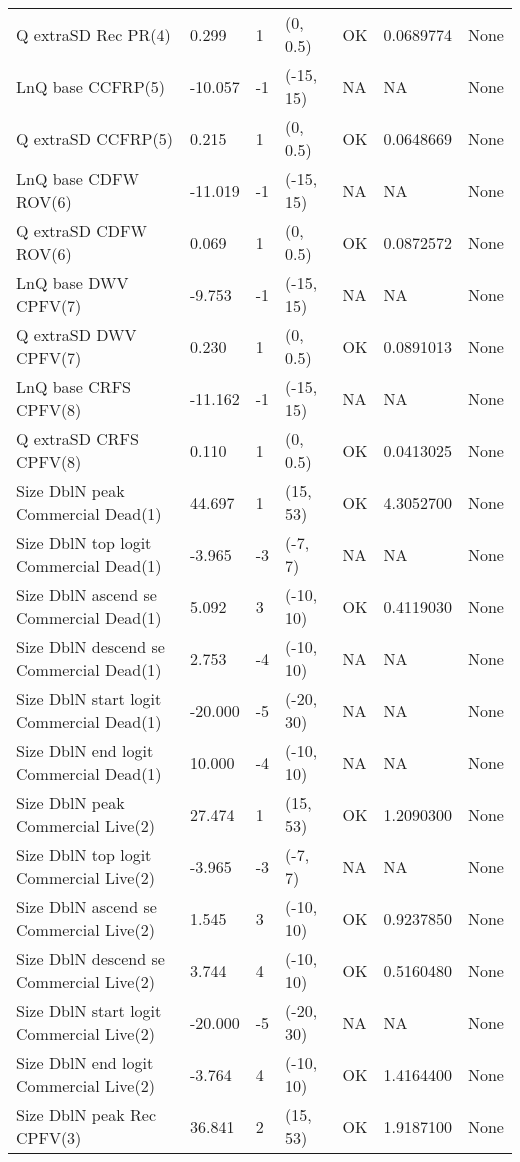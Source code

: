 \documentclass[11pt,
  english,
  letterpaper,
]{article}
\begin{document}
\begin{landscape}
\begin{longtable}[t]{>{\raggedright\arraybackslash}p{7cm}lllll>{\raggedright\arraybackslash}p{4cm}}
Q extraSD Rec PR(4) & 0.299 & 1 & (0, 0.5) & OK & 0.0689774 & None\\
LnQ base CCFRP(5) & -10.057 & -1 & (-15, 15) & NA & NA & None\\
Q extraSD CCFRP(5) & 0.215 & 1 & (0, 0.5) & OK & 0.0648669 & None\\
LnQ base CDFW ROV(6) & -11.019 & -1 & (-15, 15) & NA & NA & None\\
Q extraSD CDFW ROV(6) & 0.069 & 1 & (0, 0.5) & OK & 0.0872572 & None\\
LnQ base DWV CPFV(7) & -9.753 & -1 & (-15, 15) & NA & NA & None\\
Q extraSD DWV CPFV(7) & 0.230 & 1 & (0, 0.5) & OK & 0.0891013 & None\\
LnQ base CRFS CPFV(8) & -11.162 & -1 & (-15, 15) & NA & NA & None\\
Q extraSD CRFS CPFV(8) & 0.110 & 1 & (0, 0.5) & OK & 0.0413025 & None\\
Size DblN peak Commercial Dead(1) & 44.697 & 1 & (15, 53) & OK & 4.3052700 & None\\
Size DblN top logit Commercial Dead(1) & -3.965 & -3 & (-7, 7) & NA & NA & None\\
Size DblN ascend se Commercial Dead(1) & 5.092 & 3 & (-10, 10) & OK & 0.4119030 & None\\
Size DblN descend se Commercial Dead(1) & 2.753 & -4 & (-10, 10) & NA & NA & None\\
Size DblN start logit Commercial Dead(1) & -20.000 & -5 & (-20, 30) & NA & NA & None\\
Size DblN end logit Commercial Dead(1) & 10.000 & -4 & (-10, 10) & NA & NA & None\\
Size DblN peak Commercial Live(2) & 27.474 & 1 & (15, 53) & OK & 1.2090300 & None\\
Size DblN top logit Commercial Live(2) & -3.965 & -3 & (-7, 7) & NA & NA & None\\
Size DblN ascend se Commercial Live(2) & 1.545 & 3 & (-10, 10) & OK & 0.9237850 & None\\
Size DblN descend se Commercial Live(2) & 3.744 & 4 & (-10, 10) & OK & 0.5160480 & None\\
Size DblN start logit Commercial Live(2) & -20.000 & -5 & (-20, 30) & NA & NA & None\\
Size DblN end logit Commercial Live(2) & -3.764 & 4 & (-10, 10) & OK & 1.4164400 & None\\
Size DblN peak Rec CPFV(3) & 36.841 & 2 & (15, 53) & OK & 1.9187100 & None\\

\end{longtable}
\end{landscape}
\end{document}
